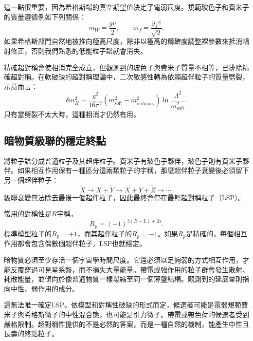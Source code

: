 這一點很重要，因為希格斯場的真空期望值決定了電弱尺度。規範玻色子和費米子的質量遵循例如下列關係：
\begin{equation}
m_W=\frac{gv}{2},
\qquad
m_f=\frac{y_fv}{\sqrt2}.
\end{equation}
如果希格斯部門自然地被推向極高尺度，除非以極高的精確度調整裸參數來抵消輻射修正，否則我們熟悉的低能粒子譜就會消失。

精確超對稱會使相消完全成立，但觀測到的玻色子與費米子質量不相等，已排除精確超對稱。在軟破缺的超對稱理論中，二次敏感性轉為依賴超伴粒子的質量劈裂，示意而言：
\begin{equation}
\delta m_H^2
\sim
\frac{g^2}{16\pi^2}
\left(m_{\mathrm{soft}}^2-m_{\mathrm{ordinary}}^2\right)
\ln\frac{\Lambda^2}{m_{\mathrm{soft}}^2}.
\end{equation}
只有當劈裂不太大時，這種相消才仍然有用。

\subsection{暗物質級聯的穩定終點}

將粒子譜分成普通粒子及其超伴粒子。費米子有玻色子夥伴，玻色子則有費米子夥伴。如果相互作用保有一種區分這兩類粒子的宇稱，那麼超伴粒子衰變後必須留下另一個超伴粒子：
\begin{equation}
\widetilde X
\longrightarrow X+\widetilde Y
\longrightarrow X+Y+\widetilde Z
\longrightarrow\cdots.
\end{equation}
級聯衰變無法除去最後一個超伴粒子，因此最終會停在最輕超對稱粒子（LSP）。

常用的對稱性是\(R\)宇稱，
\begin{equation}
R_p=(-1)^{3(B-L)+2s}.
\end{equation}
標準模型粒子的\(R_p=+1\)，而其超伴粒子的\(R_p=-1\)。如果\(R_p\)是精確的，每個相互作用都會包含偶數個超伴粒子，LSP也就穩定。

暗物質必須至少存活一個宇宙學時間尺度。它還必須以足夠弱的方式相互作用，才能反覆穿過可見星系盤，而不損失大量能量。帶電或強作用的粒子群會發生散射、耗散能量，並傾向於像普通物質一樣塌縮至同一個薄盤結構。觀測到的延展暈則指向中性、弱作用的成分。

這無法唯一確定LSP。依模型和對稱性破缺的形式而定，候選者可能是電弱規範費米子與希格斯微子的中性混合態，也可能是引力微子。帶電或帶色荷的候選者受到嚴格限制。超對稱性提供的不是必然的答案，而是一種自然的機制，能產生中性且長壽的終點粒子。

